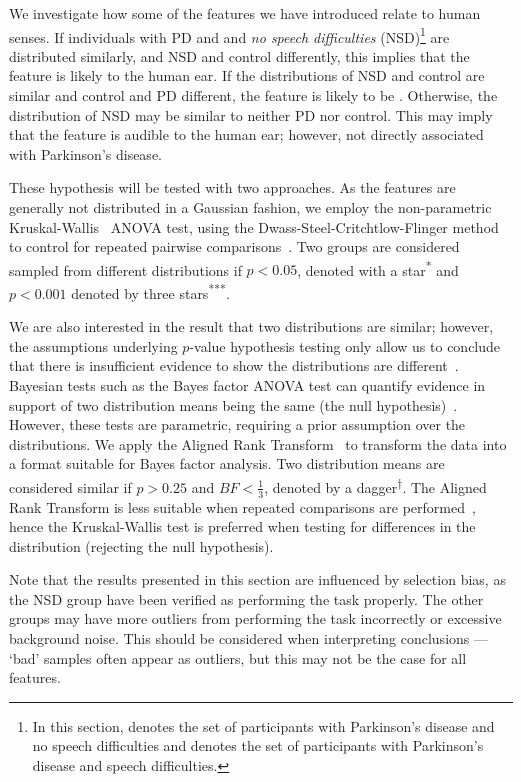 \documentclass[12pt, twoside]{book}
\renewcommand\emph[1]{\textit{\color{USred}{#1}}}
\begin{document}
\vspace{-0.2em}

We investigate how some of the features we have introduced relate to human senses. If individuals with PD and and \textit{no speech difficulties} (NSD)\footnote{In this section, \emph{NSD} denotes the set of participants with Parkinson's disease and no speech difficulties and \emph{PD} denotes the set of participants with Parkinson's disease and speech difficulties.} are distributed similarly, and NSD and control differently, this implies that the feature is likely \emph{inaudible} to the human ear. If the distributions of NSD and control are similar and control and PD different, the feature is likely to be \emph{audible}. Otherwise, the distribution of NSD may be similar to neither PD nor control. This may imply that the feature is audible to the human ear; however, not directly associated with Parkinson's disease. 


These hypothesis will be tested with two approaches. As the features are generally not distributed in a Gaussian fashion, we employ the non-parametric Kruskal-Wallis~\cite{kruskal1952use} ANOVA test, using the Dwass-Steel-Critchtlow-Flinger method to control for repeated pairwise comparisons~\cite{DCSF}. Two groups are considered sampled from different distributions if $p<0.05$, denoted with a star\textsuperscript{*} and $p<0.001$ denoted by three stars\textsuperscript{***}. 

We are also interested in the result that two distributions are similar; however, the assumptions underlying $p$-value hypothesis testing only allow us to conclude that there is insufficient evidence to show the distributions are different~\cite{fisher1937design}. Bayesian tests such as the Bayes factor ANOVA test can quantify evidence in support of two distribution means being the same (the null hypothesis)~\cite{bayesianttests}. However, these tests are parametric, requiring a prior assumption over the distributions. We apply the Aligned Rank Transform~\cite{artool} to transform the data into a format suitable for Bayes factor analysis. Two distribution means are considered similar if $p>0.25$ and $BF<\frac{1}{3}$, denoted by a dagger\textsuperscript{†}. The Aligned Rank Transform is less suitable when repeated comparisons are performed~\cite{fan2017rank}, hence the Kruskal-Wallis test is preferred when testing for differences in the distribution (rejecting the null hypothesis).

Note that the results presented in this section are influenced by selection bias, as the NSD group have been verified as performing the task properly. The other groups may have more outliers from performing the task incorrectly or excessive background noise. This should be considered when interpreting conclusions --- `bad' samples often appear as outliers, but this may not be the case for all features.
\end{document}
